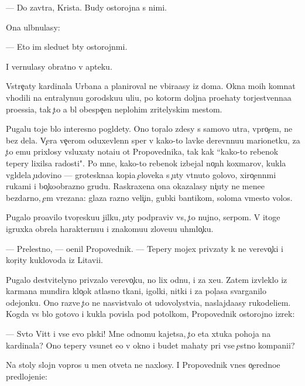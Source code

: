 \documentclass[10pt]{book}
\begin{document}
— Do zavtra, Krista. Budy ostorojna s nimi.

Ona ul{\yi}bnulasy:

— Eto im sledu{\y}et b{\yi}ty ostorojn{\yi}mi.

I vernulasy obratno v apteku.

Vstre{\c}aty kardinala Urbana {\y}a planiroval ne v{\yi}bira{\y}asy iz doma. Okna mo{\y}ih komnat v{\yi}hodili na {\q}entralynu{\y}u gorodsku{\y}u uli{\q}u, po kotor{\yi}m doljna pro{\y}ehaty torjestvenna{\y}a pro{\q}essi{\y}a, tak {\c}to {\y}a b{\yi}l obespe{\c}en neplohim zritelyskim mestom.

Pugalu toje b{\yi}lo interesno pogl{\ia}dety. Ono tor{\c}alo zdesy s samovo utra, vpro{\c}em, ne bez dela. V{\c}era ve{\c}erom oduxevlenn{\yi}{\y} sper v kako{\y}-to lavke derev{\ia}nnu{\y}u marionetku, za {\c}to {\y}emu prixlosy v{\yi}sluxaty nota{\q}i{\y}u ot Propovednika, tak kak ``kako{\y}-to rebenok tepery lixilsa radosti". Po mne, kako{\y}-to rebenok izbejal no{\c}n{\yi}h koxmarov, kukla v{\yi}gl{\ia}dela {\c}udovi{\x}no — groteskna{\y}a kopi{\y}a {\c}eloveka s {\c}uty v{\yi}t{\ia}nuto{\y} golovo{\y}, xiro{\c}enn{\yi}mi rukami i bo{\c}koobrazno{\y} grud{\y}u. Raskraxena ona okazalasy ni{\c}uty ne mene{\y}e bezdarno, {\c}em v{\yi}rezana: glaza razno{\y} veli{\c}in{\yi}, gubki bantikom, soloma vmesto volos.

Pugalo pro{\y}avilo tvor{\c}esku{\y}u jilku, {\c}uty podpraviv vs{\e}, {\c}to nujno, serpom. V itoge igruxka obrela harakternu{\y}u i znakomu{\y}u zlove{\x}u{\y}u uhm{\yi}lo{\c}ku.

— Prelestno, — o{\q}enil Propovednik. — Tepery mojex priv{\ia}zaty k ne{\y} verevo{\c}ki i kor{\c}ity kuklovoda iz Litavi{\y}i.

Pugalo de{\y}stvitelyno priv{\ia}zalo verevo{\c}ku, no lix odnu, i za xe{\y}u. Zatem izvleklo iz karmana mundira klo{\c}ok atlasno{\y} tkani, igolki, nitki i za pol{\c}asa svarganilo odejonku. Ono razve {\c}to ne nasvist{\yi}valo ot udovolystvi{\y}a, naslajda{\y}asy rukodeli{\y}em. Kogda vs{\e} b{\yi}lo gotovo i kukla povisla pod potolkom, Propovednik ostorojno izrek:

— Sv{\ia}to{\y} Vitt i vse {\y}evo pl{\ia}ski! Mne odnomu kajetsa, {\c}to eta xtuka pohoja na kardinala? Ono tepery v{\yi}sunet {\y}e{\y}o v okno i budet mahaty pri vse{\y} {\c}estno{\y} kompani{\y}i?

Na stoly slojn{\yi}{\y} vopros u men{\ia} otveta ne naxlosy. I Propovednik vnes o{\c}eredno{\y}e predlojeni{\y}e:
\end{document}
